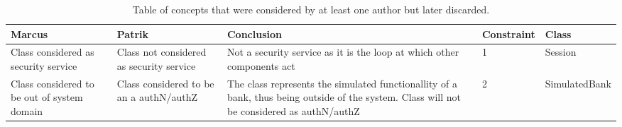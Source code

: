 \begin{sidewaystable}[]
\begin{center}
\captionsetup{justification=centering}
\caption{Table of concepts that were considered by at least one author but later discarded.}
\label{tab:groundtruthconceptnotincluded}
\hspace*{-2cm}
\begin{tabular}{p{4cm}p{4cm}p{6cm}ll}
\textbf{Marcus} & \textbf{Patrik} & \textbf{Conclusion} & \textbf{Constraint} & \textbf{Class} \\
\hline
Class considered as security service & Class not considered as security service & Not a security service as it is the loop at which other components act & 1 & Session \\
\rowcolor{RowColor}
Class considered to be out of system domain & Class considered to be an a authN/authZ  & The class represents the simulated functionallity of a bank, thus being outside of the system. Class will not be considered as authN/authZ & 2 & SimulatedBank \\
\hline
\end{tabular}
\end{center}
\end{sidewaystable}